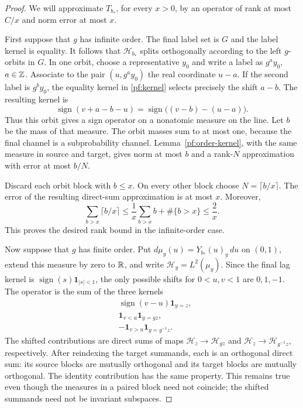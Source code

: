 \begin{proof}
We will approximate $T_{b_*}$, for every $x>0$, by an operator of rank
at most $C/x$ and norm error at most $x$.

First suppose that $g$ has infinite order.  The final label set is $G$
and the label kernel is equality.  It follows that
$\mathcal H_{b_*}$ splits orthogonally according to the left
$g$-orbits in $G$.  In one orbit, choose a representative $y_0$ and
write a label as $g^a y_0$, $a\in\mathbb Z$.  Associate to the pair
$(u,g^a y_0)$ the real coordinate $u-a$.  If the second label is
$g^b y_0$, the equality kernel in \eqref{pf:kernel} selects precisely
the shift $a-b$.  The resulting kernel is
\[
 \operatorname{sign}(v+a-b-u)
 =\operatorname{sign}\bigl((v-b)-(u-a)\bigr).
\]
Thus this orbit gives a sign operator on a nonatomic measure on the
line.  Let $b$ be the mass of that measure.  The orbit masses sum to
at most one, because the final channel is a subprobability channel.
Lemma~\ref{pf:order-kernel}, with the same measure in source and
target, gives norm at most $b$ and a rank-$N$ approximation with error
at most $b/N$.

Discard each orbit block with $b\le x$.  On every other block choose
$N=\lceil b/x\rceil$.  The error of the resulting direct-sum
approximation is at most $x$.  Moreover,
\[
 \sum_{b>x}\lceil b/x\rceil
 \le \frac1x\sum_{b>x}b+\#\{b>x\}
 \le \frac2x.
\]
This proves the desired rank bound in the infinite-order case.

Now suppose that $g$ has finite order.  Put
$d\mu_y(u)=Y_{b_*}(u)_y\,du$ on $(0,1)$, extend this measure by zero
to $\mathbb R$, and write $\mathcal H_y=L^2(\mu_y)$.
Since the final lag kernel is
$\operatorname{sign}(s)\mathbf1_{|s|<1}$, the only possible shifts for
$0<u,v<1$ are $0,1,-1$.  The operator is the sum of the three kernels
\begin{equation}
 \begin{split}
  &\operatorname{sign}(v-u)\mathbf1_{y=z},\\
  &\mathbf1_{v<u}\mathbf1_{y=gz},\\
  &-\mathbf1_{v>u}\mathbf1_{y=g^{-1}z}.
 \end{split}
 \label{pf:three-shifts}
\end{equation}
The shifted contributions are direct sums of maps
$\mathcal H_z\to\mathcal H_{gz}$ and
$\mathcal H_z\to\mathcal H_{g^{-1}z}$, respectively.  After reindexing
the target summands, each is an orthogonal direct sum: its source
blocks are mutually orthogonal and its target blocks are mutually
orthogonal.  The identity contribution has the same property.
This remains true even though the measures in a paired block need
not coincide; the shifted summands need not be invariant subspaces.


\end{proof}
